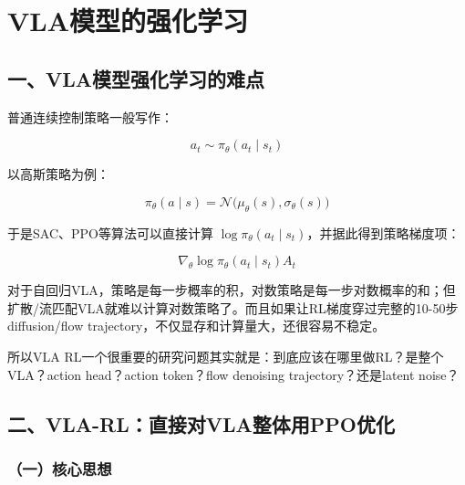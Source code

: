 \setcounter{section}{1}

\hypertarget{vlaux6a21ux578bux7684ux5f3aux5316ux5b66ux4e60}{%
\section{VLA模型的强化学习}\label{vlaux6a21ux578bux7684ux5f3aux5316ux5b66ux4e60}}

\hypertarget{ux4e00vlaux6a21ux578bux5f3aux5316ux5b66ux4e60ux7684ux96beux70b9}{%
\subsection{一、VLA模型强化学习的难点}\label{ux4e00vlaux6a21ux578bux5f3aux5316ux5b66ux4e60ux7684ux96beux70b9}}

普通连续控制策略一般写作：

\[
a_t\sim\pi_\theta(a_t\mid s_t)
\]

以高斯策略为例：

\[
\pi_\theta(a\mid s)=\mathcal{N}\bigl(\mu_\theta(s),\sigma_\theta(s)\bigr)
\]

于是SAC、PPO等算法可以直接计算 \(\log\pi_\theta(a_t\mid s_t)\)，并据此得到策略梯度项：

\[
\nabla_\theta\log\pi_\theta(a_t\mid s_t)A_t
\]

对于自回归VLA，策略是每一步概率的积，对数策略是每一步对数概率的和；但扩散/流匹配VLA就难以计算对数策略了。而且如果让RL梯度穿过完整的10-50步diffusion/flow trajectory，不仅显存和计算量大，还很容易不稳定。

所以VLA RL一个很重要的研究问题其实就是：到底应该在哪里做RL？是整个VLA？action head？action token？flow denoising trajectory？还是latent noise？

\hypertarget{ux4e8cvla-rlux76f4ux63a5ux5bf9vlaux6574ux4f53ux7528ppoux4f18ux5316}{%
\subsection{二、VLA-RL：直接对VLA整体用PPO优化}\label{ux4e8cvla-rlux76f4ux63a5ux5bf9vlaux6574ux4f53ux7528ppoux4f18ux5316}}

\hypertarget{ux4e00ux6838ux5fc3ux601dux60f3-14}{%
\subsubsection{（一）核心思想}\label{ux4e00ux6838ux5fc3ux601dux60f3-14}}

